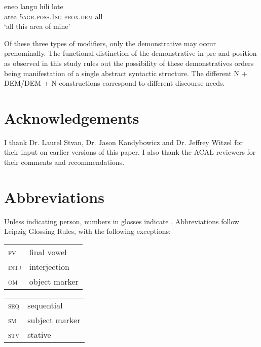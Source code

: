 \documentclass[output=paper,
modfonts
]{langscibook}
\begin{document}
\ea\label{ex:mwamzandi:20}
\gll  eneo langu hili lote\\
     area \textsc{5agr}.\textsc{poss}.\textsc{1sg} \textsc{prox}.\textsc{dem} all\\
\glt ‘all this area of mine’
\z

Of these three types of modifiers, only the demonstrative may occur prenominally. The functional distinction of the demonstrative in pre and  position as observed in this study rules out the possibility of these demonstratives orders being manifestation of a single abstract syntactic structure. The different N + DEM/DEM + N constructions correspond to different discourse needs.

\section*{Acknowledgements}
I thank Dr. Laurel Stvan, Dr. Jason Kandybowicz and Dr. Jeffrey Witzel for their input on earlier versions of this paper. I also thank the ACAL reviewers for their comments and recommendations.

\section*{Abbreviations}

Unless indicating person, numbers in glosses indicate . Abbreviations follow Leipzig Glossing Rules, with the following exceptions:
\bigskip

\begin{tabular}{ll}
 \textsc{fv} & final vowel\\
 \textsc{intj} & interjection\\
\textsc{om} & object marker\\
\end{tabular}
\begin{tabular}{ll}
 \textsc{seq} & sequential\\
 \textsc{sm} & subject marker\\
 \textsc{stv} & stative
\end{tabular}
 
{\sloppy
\printbibliography[heading=subbibliography,notkeyword=this]
}
\end{document}
